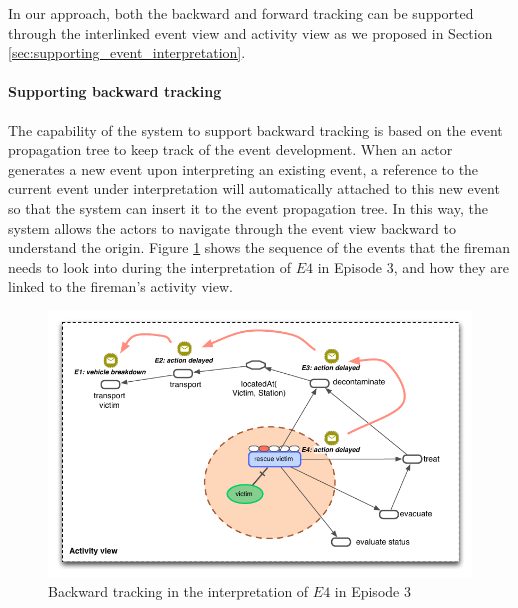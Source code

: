 In our approach, both the backward and forward tracking can be supported through the interlinked event view and activity view as we proposed in Section \ref{sec:supporting_event_interpretation}. 

\paragraph*{Supporting backward tracking} %
\label{par:supporting_backward_tracking}
The capability of the system to support backward tracking is based on the event propagation tree to keep track of the event development. When an actor generates a new event upon interpreting an existing event, a reference to the current event under interpretation will automatically attached to this new event so that the system can insert it to the event propagation tree. In this way, the system allows the actors to navigate through the event view backward to understand the origin. Figure \ref{fig:backward_chain} shows the sequence of the events that the fireman needs to look into during the interpretation of $E4$ in Episode 3, and how they are linked to the fireman's activity view. 

\begin{figure}[htbp] %
	\centering
	\includegraphics{backward_chain.pdf} 
	\caption{Backward tracking in the interpretation of $E4$ in Episode 3}
	\label{fig:backward_chain}
\end{figure}

